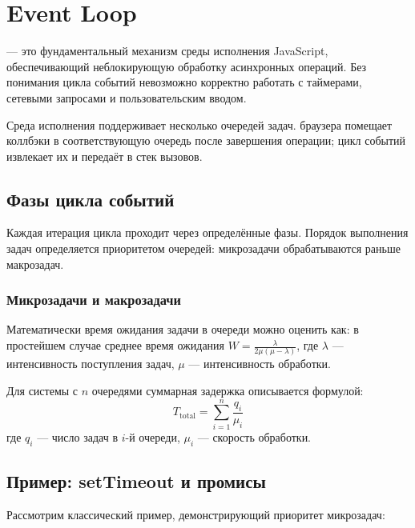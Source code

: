 \section{Event Loop}

 — это фундаментальный механизм среды
исполнения JavaScript, обеспечивающий неблокирующую обработку
асинхронных операций. Без понимания цикла событий невозможно корректно
работать с таймерами, сетевыми запросами и пользовательским вводом.

Среда исполнения поддерживает несколько очередей задач.
браузера помещает коллбэки в соответствующую очередь после завершения
операции; цикл событий извлекает их и передаёт в стек вызовов.

\subsection{Фазы цикла событий}

Каждая итерация цикла проходит через определённые фазы. Порядок
выполнения задач определяется приоритетом очередей: микрозадачи
обрабатываются раньше макрозадач.

\subsubsection{Микрозадачи и макрозадачи}

Математически время ожидания задачи в очереди можно оценить как:
в простейшем случае среднее время ожидания $W = \frac{\lambda}{2\mu(\mu - \lambda)}$,
где $\lambda$ — интенсивность поступления задач, $\mu$ — интенсивность обработки.

Для системы с $n$ очередями суммарная задержка описывается формулой:
\begin{equation}
  T_{\text{total}} = \sum_{i=1}^{n} \frac{q_i}{\mu_i}
  \label{eq:event-loop-delay}
\end{equation}
где $q_i$ — число задач в $i$-й очереди, $\mu_i$ — скорость обработки.

\subsection{Пример: setTimeout и промисы}

Рассмотрим классический пример, демонстрирующий приоритет микрозадач:

